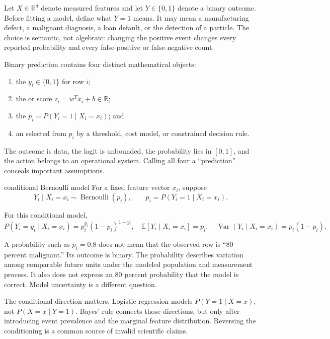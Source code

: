 Let $X\in\mathbb{R}^d$ denote measured features and let $Y\in\{0,1\}$ denote a
binary outcome. Before fitting a model, define what $Y=1$ means. It may mean a
manufacturing defect, a malignant diagnosis, a loan default, or the detection
of a particle. The choice is semantic, not algebraic: changing the positive
event changes every reported probability and every false-positive or
false-negative count.

Binary prediction contains four distinct mathematical objects:
\begin{enumerate}
  \item the  $y_i\in\{0,1\}$ for row $i$;
  \item the  or score $z_i=w^Tx_i+b\in\mathbb{R}$;
  \item the  $p_i=P(Y_i=1\mid X_i=x_i)$; and
  \item an  selected from $p_i$ by a threshold, cost model, or
  constrained decision rule.
\end{enumerate}
The outcome is data, the logit is unbounded, the probability lies in $[0,1]$,
and the action belongs to an operational system. Calling all four a
``prediction'' conceals important assumptions.

\begin{definitionbox}{conditional Bernoulli model}
For a fixed feature vector $x_i$, suppose
\[
Y_i\mid X_i=x_i\sim\operatorname{Bernoulli}(p_i),
\qquad p_i=P(Y_i=1\mid X_i=x_i).
\]
\end{definitionbox}

For this conditional model,
\[
P(Y_i=y_i\mid X_i=x_i)=p_i^{y_i}(1-p_i)^{1-y_i},
\quad
\mathbb{E}[Y_i\mid X_i=x_i]=p_i,
\quad
\operatorname{Var}(Y_i\mid X_i=x_i)=p_i(1-p_i).
\]

A probability such as $p_i=0.8$ does not mean that the observed row is
``80 percent malignant.'' Its outcome is binary. The probability describes
variation among comparable future units under the modeled population and
measurement process. It also does not express an 80 percent probability that
the model is correct. Model uncertainty is a different question.

The conditional direction matters. Logistic regression models
$P(Y=1\mid X=x)$, not $P(X=x\mid Y=1)$. Bayes' rule connects those directions,
but only after introducing event prevalence and the marginal feature
distribution. Reversing the conditioning is a common source of invalid
scientific claims.

